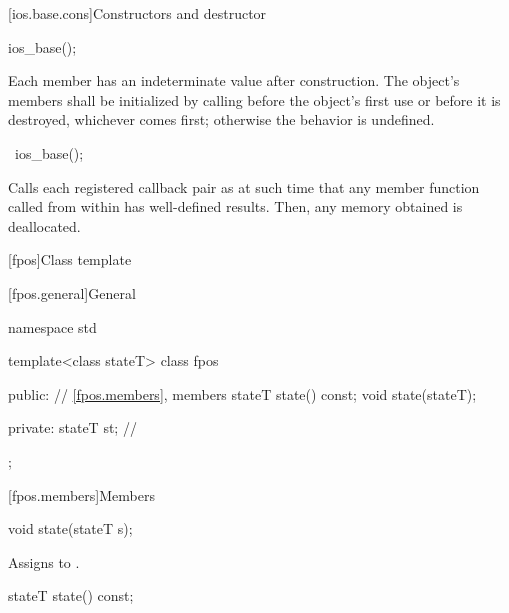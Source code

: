 [ios.base.cons]{Constructors and destructor}

%
\begin{itemdecl}
ios_base();
\end{itemdecl}

\begin{itemdescr}
\pnum
\effects
Each
member has an indeterminate value after construction.
The object's members shall be initialized by calling
before the object's first use or before it is destroyed, whichever comes first; otherwise
the behavior is undefined.
\end{itemdescr}

%
\begin{itemdecl}
~ios_base();
\end{itemdecl}

\begin{itemdescr}
\pnum
\effects
Calls each registered callback pair
 as
at such time that any
member function called from within
has well-defined results.
Then, any memory obtained is deallocated.
\end{itemdescr}

[fpos]{Class template }

[fpos.general]{General}

%
\begin{codeblock}
namespace std {
  template<class stateT> class fpos {
  public:
    // \ref{fpos.members}, members
    stateT state() const;
    void state(stateT);

  private:
    stateT st;                  // \expos
  };
}
\end{codeblock}

[fpos.members]{Members}

%
\begin{itemdecl}
void state(stateT s);
\end{itemdecl}

\begin{itemdescr}
\pnum
\effects
Assigns  to .
\end{itemdescr}

%
\begin{itemdecl}
stateT state() const;
\end{itemdecl}

